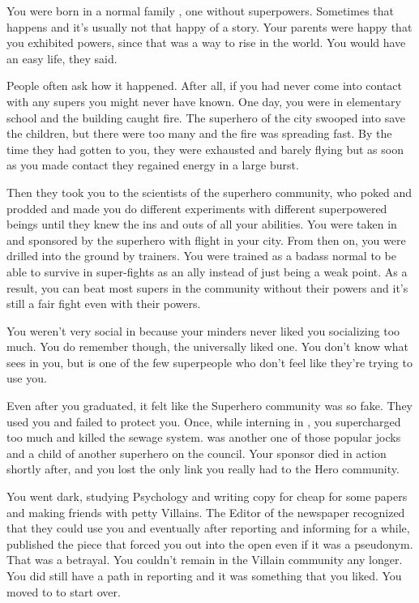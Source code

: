 \documentclass[char]{LRSguildcamp1}
\begin{document}
\name{\cYS{}}

You were born in a normal family , one without superpowers. Sometimes that happens and it's usually not that happy of a story. Your parents were happy that you exhibited powers, since that was a way to rise in the world. You would have an easy life, they said. 

People often ask how it happened. After all, if you had never come into contact with any supers you might never have known. One day, you were in elementary school and the building caught fire. The superhero of the city swooped into save the children, but there were too many and the fire was spreading fast. By the time they had gotten to you, they were exhausted and barely flying but as soon as you made contact they regained energy in a large burst. 

Then they took you to the scientists of the superhero community, who poked and prodded and made you do different experiments with different superpowered beings until they knew the ins and outs of all your abilities. You were taken in and sponsored by the superhero with flight in your city. From then on, you were drilled into the ground by trainers. You were trained as a badass normal to be able to survive in super-fights as an ally instead of just being a weak point. As a result, you can beat most supers in the community without their powers and it's still a fair fight even with their powers.  

You weren't very social in \pSuperSchool{} because your minders never liked you socializing too much. You do remember \cYoungest{} though, the universally liked one. You don't know what \cYoungest{} sees in you, but \cYoungest{} is one of the few superpeople who don't feel like they're trying to use you. 

Even after you graduated, it felt like the Superhero community was so fake. They used you and failed to protect you. Once, while interning in \pCityO{} , you supercharged \cJuggernaut{} too much and killed the sewage system. \cJuggernaut{} was another one of those popular jocks and a child of another superhero on the council. Your sponsor died in action shortly after, and you lost the only link you really had to the Hero community. 

You went dark, studying Psychology and writing copy for cheap for some papers and making friends with petty Villains. The Editor of the newspaper recognized that they could use you and eventually after reporting and informing for a while, published the piece that forced you out into the open even if it was a pseudonym. That was a betrayal. You couldn't remain in the Villain community any longer. You did still have a path in reporting and it was something that you liked. You moved to \pCityY{} to start over. 
\end{document}
